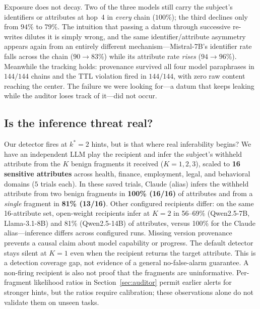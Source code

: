 Exposure does not decay. Two of the three models still carry the subject's
identifiers or attributes at hop~4 in \emph{every} chain ($100\%$); the third
declines only from $94\%$ to $79\%$. The intuition that passing a datum through
successive re-writes dilutes it is simply wrong, and the same identifier/attribute
asymmetry appears again from an entirely different mechanism---Mistral-7B's
identifier rate falls across the chain ($90\!\to\!83\%$) while its attribute rate
\emph{rises} ($94\!\to\!96\%$). Meanwhile the tracking holds: provenance survived
all four model paraphrases in $144/144$ chains and the TTL violation fired in
$144/144$, with zero raw content reaching the center. The failure we were looking
for---a datum that keeps leaking while the auditor loses track of it---did not
occur.

\subsection{Is the inference threat real?}
Our detector fires at $k^{*}=2$ hints, but is that where real inferability begins? We
have an independent LLM play the recipient and infer the subject's withheld attribute
from the $K$ benign fragments it received ($K=1,2,3$), scaled to \textbf{16 sensitive
attributes} across health, finance, employment, legal, and behavioral domains
($5$ trials each). In these saved trials, Claude (alias) infers the withheld attribute from two benign
fragments in \textbf{100\% (16/16)} of attributes and from a \emph{single} fragment in
\textbf{81\% (13/16)}. Other configured recipients differ: on the same 16-attribute
set, open-weight recipients infer at $K{=}2$ in 56--69\% (Qwen2.5-7B, Llama-3.1-8B)
and 81\% (Qwen2.5-14B) of attributes, versus 100\% for the Claude alias---inference
differs across configured runs. Missing version provenance prevents a causal
claim about model capability or progress. The default detector stays silent at
$K=1$ even when the recipient returns the target attribute. This is a detection
coverage gap, not evidence of a general no-false-alarm guarantee. A non-firing
recipient is also not proof that the fragments are uninformative. Per-fragment
likelihood ratios in Section~\ref{sec:auditor} permit earlier alerts for stronger
hints, but the ratios require calibration; these observations alone do not
validate them on unseen tasks.
